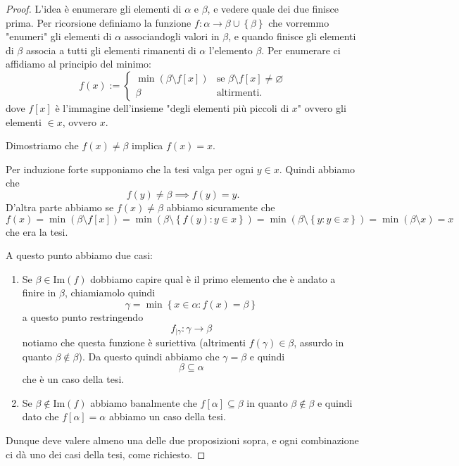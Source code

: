 \documentclass[11pt]{scrartcl}
\newcommand{\eset}{\varnothing}
\begin{document}
 	\begin{proof}
 		L'idea è enumerare gli elementi di $\alpha$ e $\beta$, e vedere quale dei due finisce prima. Per ricorsione definiamo la funzione $f:\alpha\to\beta\cup\left\{\beta\right\}$ che vorremmo "enumeri" gli elementi di $\alpha$ associandogli valori in $\beta$, e quando finisce gli elementi di $\beta$ associa a tutti gli elementi rimanenti di $\alpha$ l'elemento $\beta$. Per enumerare ci affidiamo al principio del minimo:
 		$$f(x):=\begin{cases}
 			\min (\beta\setminus f[x]) & \text{se $\beta\setminus f[x]\ne \eset$} \\
 			\beta & \text{altirmenti.}
 		\end{cases}$$
 		dove $f[x]$ è l'immagine dell'insieme "degli elementi più piccoli di $x$" ovvero gli elementi $\in x$, ovvero $x$.
 		\begin{claim}
 			Dimostriamo che $f(x)\ne \beta$ implica $f(x)=x$.
 		\end{claim}
 		\begin{subproof}
 			Per induzione forte supponiamo che la tesi valga per ogni $y\in x$. Quindi abbiamo che
 			$$f(y)\ne \beta \implies f(y)=y.$$
 			D'altra parte abbiamo se $f(x)\ne \beta$ abbiamo sicuramente che 
 			$$f(x)=\min(\beta\setminus f[x])=\min\left(\beta\setminus \left\{f(y):y\in x\right\}\right)=\min\left(\beta\setminus \left\{y:y\in x\right\}\right)=\min(\beta\setminus x)=x$$
 			che era la tesi.
 		\end{subproof}
 		A questo punto abbiamo due casi:
 		\begin{enumerate}
 			\item Se $\beta\in \text{Im}(f)$ dobbiamo capire qual è il primo elemento che è andato a finire in $\beta$, chiamiamolo quindi
 			$$\gamma=\min\left\{x\in \alpha:f(x)=\beta\right\}$$
 			a questo punto restringendo
 			$$f_{\mid \gamma}:\gamma\to \beta$$
 			notiamo che questa funzione è suriettiva (altrimenti $f(\gamma)\in \beta$, assurdo in quanto $\beta\not\in\beta$). Da questo quindi abbiamo che $\gamma=\beta$ e quindi 
 			$$\beta\subseteq \alpha$$
 			che è un caso della tesi.
 			\item Se $\beta\not\in \text{Im}(f)$ abbiamo banalmente che $f[\alpha]\subseteq \beta$ in quanto $\beta\not\in \beta$ e quindi dato che $f[\alpha]=\alpha$ abbiamo un caso della tesi.
 		\end{enumerate}
 		Dunque deve valere almeno una delle due proposizioni sopra, e ogni combinazione ci dà uno dei casi della tesi, come richiesto.
 	\end{proof}
\end{document}
